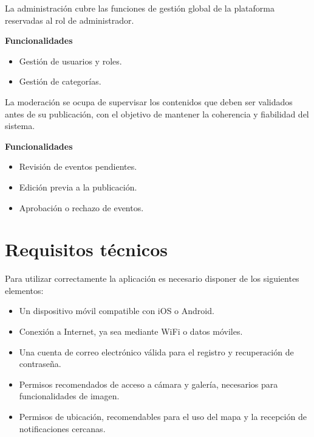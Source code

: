 \begin{tcolorbox}[title=\textbf{Administración}]
La administración cubre las funciones de gestión global de la plataforma reservadas al rol de administrador.

\vspace{0.4em}
\textbf{Funcionalidades}
\begin{itemize}[leftmargin=1.5em]
\item Gestión de usuarios y roles.
\item Gestión de categorías.
\end{itemize}
\end{tcolorbox}

\begin{tcolorbox}[title=\textbf{Moderación}]
La moderación se ocupa de supervisar los contenidos que deben ser validados antes de su publicación, con el objetivo de mantener la coherencia y fiabilidad del sistema.

\vspace{0.4em}
\textbf{Funcionalidades}
\begin{itemize}[leftmargin=1.5em]
\item Revisión de eventos pendientes.
\item Edición previa a la publicación.
\item Aprobación o rechazo de eventos.
\end{itemize}
\end{tcolorbox}

\section{Requisitos técnicos}

Para utilizar correctamente la aplicación es necesario disponer de los siguientes elementos:

\begin{itemize}[leftmargin=1.5em]
\item Un dispositivo móvil compatible con iOS o Android.
\item Conexión a Internet, ya sea mediante WiFi o datos móviles.
\item Una cuenta de correo electrónico válida para el registro y recuperación de contraseña.
\item Permisos recomendados de acceso a cámara y galería, necesarios para funcionalidades de imagen.
\item Permisos de ubicación, recomendables para el uso del mapa y la recepción de notificaciones cercanas.
\end{itemize}

